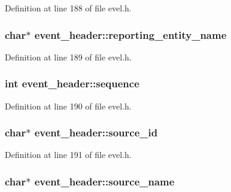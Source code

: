 Definition at line 188 of file evel.\+h.

\hypertarget{structevent__header_a105ed7207010f12bb7ffccf3cb712536}{}
\subsubsection[{reporting\+\_\+entity\+\_\+name}]{\setlength{\rightskip}{0pt plus 5cm}char$\ast$ event\+\_\+header\+::reporting\+\_\+entity\+\_\+name}\label{structevent__header_a105ed7207010f12bb7ffccf3cb712536}


Definition at line 189 of file evel.\+h.

\hypertarget{structevent__header_a3640c2b0a997500273b6db73f050ff10}{}
\subsubsection[{sequence}]{\setlength{\rightskip}{0pt plus 5cm}int event\+\_\+header\+::sequence}\label{structevent__header_a3640c2b0a997500273b6db73f050ff10}


Definition at line 190 of file evel.\+h.

\hypertarget{structevent__header_a713d1a737d2b3330c008863fea17797b}{}
\subsubsection[{source\+\_\+id}]{\setlength{\rightskip}{0pt plus 5cm}char$\ast$ event\+\_\+header\+::source\+\_\+id}\label{structevent__header_a713d1a737d2b3330c008863fea17797b}


Definition at line 191 of file evel.\+h.

\hypertarget{structevent__header_a5619697d328950141c426df951988f94}{}
\subsubsection[{source\+\_\+name}]{\setlength{\rightskip}{0pt plus 5cm}char$\ast$ event\+\_\+header\+::source\+\_\+name}\label{structevent__header_a5619697d328950141c426df951988f94}


